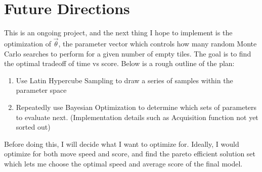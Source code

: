 \documentclass{article}
\begin{document}
\section{Future Directions}
This is an ongoing project, and the next thing I hope to implement is the optimization of $\vec{\theta}$, the parameter vector which controls how many random Monte Carlo searches to perform for a given number of empty tiles.  The goal is to find the optimal tradeoff of time vs score.  Below is a rough outline of the plan:
\begin{enumerate}
	\item Use Latin Hypercube Sampling to draw a series of samples within the parameter space
	\item Repeatedly use Bayesian Optimization to determine which sets of parameters to evaluate next. (Implementation details such as Acquisition function not yet sorted out)
\end{enumerate}

Before doing this, I will decide what I want to optimize for.  Ideally, I would optimize for both move speed and score, and find the pareto efficient solution set which lets me choose the optimal speed and average score of the final model. 





\end{document}
